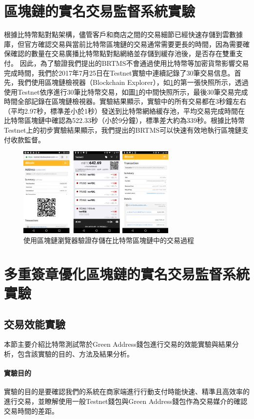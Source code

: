 	\section{區塊鏈的實名交易監督系統實驗}
	根據比特幣點對點架構，儘管客戶和商店之間的交易細節已經快速存儲到雲數據庫，但官方確認交易與當前比特幣區塊鏈的交易通常需要更長的時間，因為需要確保確認的數量在交易廣播比特幣點對點網絡並存儲到緩存池後，是否存在雙重支付。
	因此，為了驗證我們提出的BRTMS不會通過使用比特幣等加密貨幣影響交易完成時間，我們於2017年7月25日在Testnet實驗中連續記錄了30筆交易信息。首先，我們使用區塊鏈檢視器（Blockchain Explorer）\supercite{Blockchainexplorer:Ananalyticalprocessandinvestigationenvironmentforbitcoin}，如\ref{fig9}的第一張快照所示，透過使用Testnet依序進行30筆比特幣交易，如圖\ref{fig9}的中間快照所示，最後30筆交易完成時間全部記錄在區塊鏈檢視器。實驗結果顯示，實驗中的所有交易都在3秒鐘左右（平均2.97秒，標準差小於1秒）發送到比特幣網絡緩存池，平均交易完成時間在比特幣區塊鏈中確認為522.33秒（小於9分鐘），標準差大約為339秒。根據比特幣Testnet上的初步實驗結果顯示，我們提出的BRTMS可以快速有效地執行區塊鏈支付收款監督。

	\begin{figure}[h]
		\centering
		\includegraphics[width = 0.7\textwidth]{fig9.png}
		\caption{使用區塊鏈瀏覽器驗證存儲在比特幣區塊鏈中的交易過程}\label{fig9}
	\end{figure}

	\section{多重簽章優化區塊鏈的實名交易監督系統實驗}
		\subsection{交易效能實驗}
		本節主要介紹比特幣測試幣於Green Address錢包進行交易的效能實驗與結果分析，包含該實驗的目的、方法及結果分析。

			\paragraph{實驗目的}實驗的目的是要確認我們的系統在商家端進行行動支付時能快速、精準且高效率的進行交易，並瞭解使用一般Testnet錢包與Green Address錢包作為交易媒介的確認交易時間的差距。
